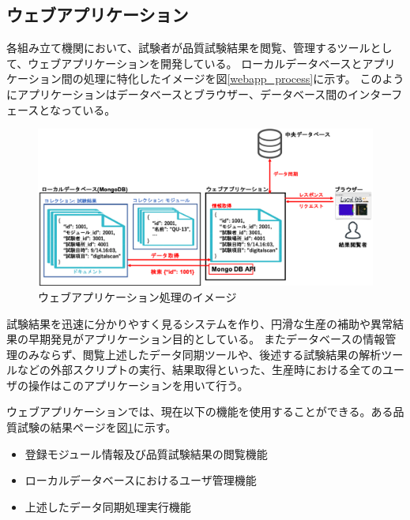 \subsection{ウェブアプリケーション}
各組み立て機関において、試験者が品質試験結果を閲覧、管理するツールとして、ウェブアプリケーションを開発している。
ローカルデータベースとアプリケーション間の処理に特化したイメージを図\ref{webapp_process}に示す。
このようにアプリケーションはデータベースとブラウザー、データベース間のインターフェースとなっている。

\begin{figure}[bpt]\centering
\includegraphics[width=16cm]{webapp_process}
\caption[ウェブアプリケーション処理のイメージ]{ウェブアプリケーション処理のイメージ}
\label{viewer_result}
\end{figure}

試験結果を迅速に分かりやすく見るシステムを作り、円滑な生産の補助や異常結果の早期発見がアプリケーション目的としている。
またデータベースの情報管理のみならず、閲覧上述したデータ同期ツールや、後述する試験結果の解析ツールなどの外部スクリプトの実行、結果取得といった、生産時における全てのユーザの操作はこのアプリケーションを用いて行う。

ウェブアプリケーションでは、現在以下の機能を使用することができる。ある品質試験の結果ページを図\ref{viewer_result}に示す。

\begin{itemize}
  \item 登録モジュール情報及び品質試験結果の閲覧機能
  \item ローカルデータベースにおけるユーザ管理機能
  \item 上述したデータ同期処理実行機能
\end{itemize}

